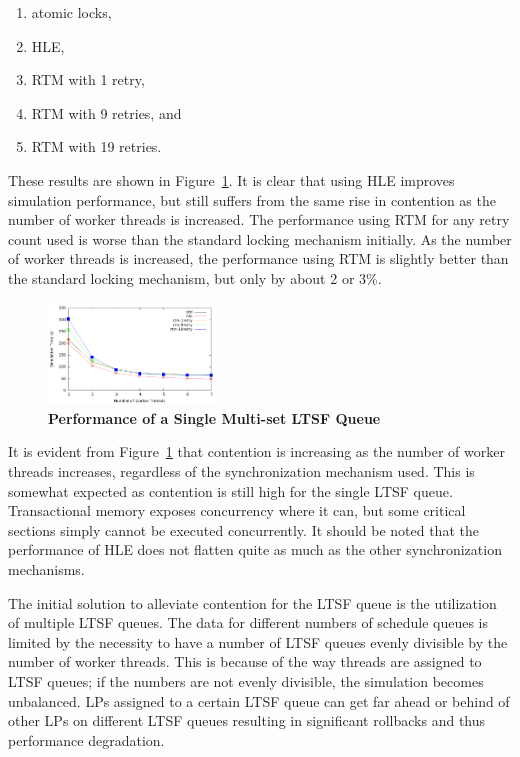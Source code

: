 \documentclass{sig-alternate}
\begin{document}
\begin{enumerate}
  \setlength{\itemsep}{-0.05in}
  \item atomic locks, 
  \item HLE, 
  \item RTM with 1 retry, 
  \item RTM with 9 retries, and 
  \item RTM with 19 retries.  
\end{enumerate}

\noindent
These results are shown in Figure~\ref{fig:noThrMig_timeVSthreads_1schq}.  It is clear
that using HLE improves simulation performance, but still suffers from the same rise in
contention as the number of worker threads is increased.  The performance using RTM for
any retry count used is worse than the standard locking mechanism initially.  As the
number of worker threads is increased, the performance using RTM is slightly better than
the standard locking mechanism, but only by about 2 or 3\%.

\begin{figure}
    \centering
    \graphicspath{ {./figures/} }
    \includegraphics[width=0.4\textwidth,keepaspectratio]{hugeepidemicsim-NOmig-timeVSthreads-multiset-1schQ}
    \caption{\textbf{Performance of a Single Multi-set LTSF Queue}}
    \label{fig:noThrMig_timeVSthreads_1schq}
\end{figure}

It is evident from Figure~\ref{fig:noThrMig_timeVSthreads_1schq} that contention is
increasing as the number of worker threads increases, regardless of the synchronization
mechanism used.  This is somewhat expected as contention is still high for the single LTSF
queue.  Transactional memory exposes concurrency where it can, but some critical sections
simply cannot be executed concurrently.  It should be noted that the performance of HLE
does not flatten quite as much as the other synchronization mechanisms.

The initial solution to alleviate contention for the LTSF queue is the utilization of
multiple LTSF queues.  The data for different numbers of schedule queues is limited by the
necessity to have a number of LTSF queues evenly divisible by the number of worker
threads.  This is because of the way threads are assigned to LTSF queues; if the numbers
are not evenly divisible, the simulation becomes unbalanced.  LPs assigned to a certain
LTSF queue can get far ahead or behind of other LPs on different LTSF queues resulting in
significant rollbacks and thus performance degradation.
\end{document}
